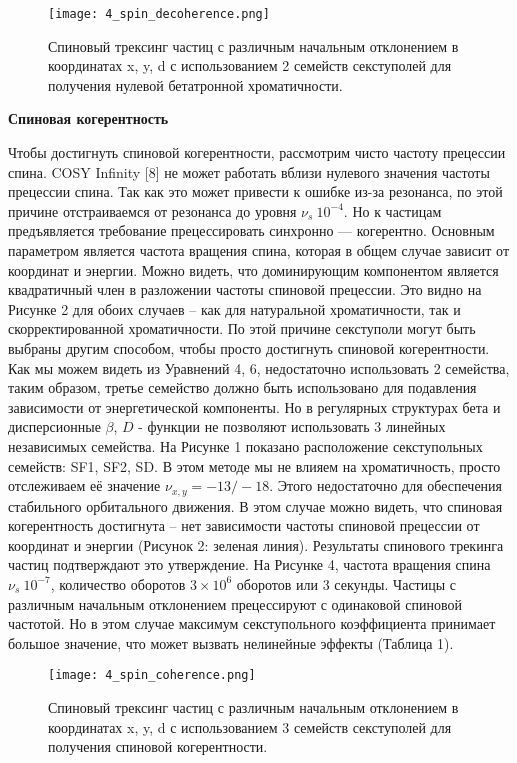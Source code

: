 \begin{figure}[!h]
  \centering
   \texttt{[image: 4\_spin\_decoherence.png]}
   \caption{Спиновый трексинг частиц с различным начальным отклонением в координатах x, y, d с использованием 2 семейств секступолей для получения нулевой бетатронной хроматичности.}
   \label{fig:4_spin_decoherence}
\end{figure}

\textbf{Спиновая когерентность}
\par Чтобы достигнуть спиновой когерентности, рассмотрим чисто частоту прецессии спина. COSY Infinity [8] не может работать вблизи нулевого значения частоты прецессии спина. Так как это может привести к ошибке из-за резонанса, по этой причине отстраиваемся от резонанса до уровня $\nu_s~{10}^{-4}$. Но к частицам предъявляется требование прецессировать синхронно — когерентно. 
Основным параметром является частота вращения спина, которая в общем случае зависит от координат и энергии. Можно видеть, что доминирующим компонентом является квадратичный член в разложении частоты спиновой прецессии. Это видно на Рисунке 2 для обоих случаев – как для натуральной хроматичности, так и скорректированной хроматичности. По этой причине секступоли могут быть выбраны другим способом, чтобы просто достигнуть спиновой когерентности.
Как мы можем видеть из Уравнений 4, 6, недостаточно использовать 2 семейства, таким образом, третье семейство должно быть использовано для подавления зависимости от энергетической компоненты. Но в регулярных структурах бета и дисперсионные $\beta$, $D$ - функции не позволяют использовать 3 линейных независимых семейства. На Рисунке 1 показано расположение секступольных семейств: SF1, SF2, SD. В этом методе мы не влияем на хроматичность, просто отслеживаем её значение $\nu_{x,y}=-13/-18$. Этого недостаточно для обеспечения стабильного орбитального движения. В этом случае можно видеть, что спиновая когерентность достигнута – нет зависимости частоты спиновой прецессии от координат и энергии (Рисунок 2: зеленая линия). Результаты спинового трекинга частиц подтверждают это утверждение. На Рисунке 4, частота вращения спина $\nu_s~{10}^{-7}$, количество оборотов $3\times{10}^6$ оборотов или $3$ секунды. Частицы с различным начальным отклонением прецессируют с одинаковой спиновой частотой. Но в этом случае максимум секступольного коэффициента принимает большое значение, что может вызвать нелинейные эффекты (Таблица 1).

\begin{figure}[!h]
  \centering
   \texttt{[image: 4\_spin\_coherence.png]}
   \caption{Спиновый трексинг частиц с различным начальным отклонением в координатах x, y, d с использованием 3 семейств секступолей для получения спиновой когерентности.}
   \label{fig:4_spin_coherence}
\end{figure}

